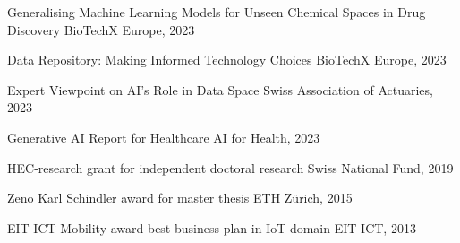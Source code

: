 
\begin{cventries}

		
		\vspace{-0.25cm}
		\cventry
		{}
		{\textnormal{Generalising Machine Learning Models for Unseen Chemical Spaces in Drug Discovery}}
		{BioTechX Europe, 2023}
		{}
		{}
	
		\vspace{-1cm}
		\cventry
		{}
		{\textnormal{Data Repository: Making Informed Technology Choices}}
		{BioTechX Europe, 2023}
		{}
		{}
		
		\vspace{-1cm}
		\cventry
		{}
		{\textnormal{Expert Viewpoint on AI's Role in Data Space}}
		{Swiss Association of Actuaries, 2023}
		{}
		{}
		
		\vspace{-1cm}
		\cventry
		{}
		{\textnormal{Generative AI Report for Healthcare}}
		{AI for Health, 2023}
		{}
		{}
		
		\vspace{-1cm}
		\cventry
		{}
		{\textnormal{HEC-research grant for independent doctoral research}}
		{Swiss National Fund, 2019}
		{}
		{}
		
		\vspace{-1cm}
		\cventry
		{}
		{\textnormal{Zeno Karl Schindler award for master thesis}}
		{ETH Zürich, 2015}
		{}
		{}
		
		\vspace{-1cm}
		\cventry
		{}
		{\textnormal{EIT-ICT Mobility award best business plan in IoT domain}}
		{EIT-ICT, 2013}
		{}
		{}
		
		\vspace{-1.3cm}
	\end{cventries}
	